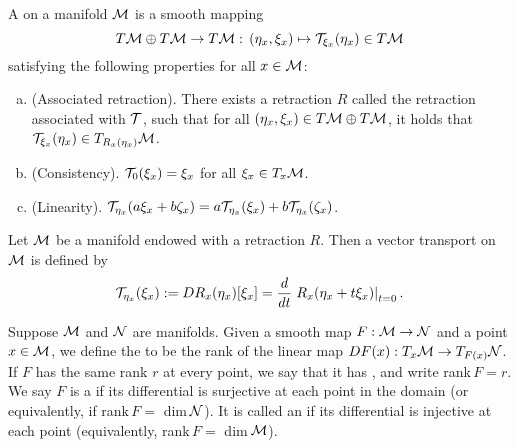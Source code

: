 \documentclass[11pt,a4paper]{article}
\begin{document}
\begin{definition}\label{def:vector_transport}
A  on a manifold $\mathcal{M}$ is a smooth mapping
\begin{equation*}
T\mathcal{M}\oplus T\mathcal{M}\rightarrow T\mathcal{M} :\,(\eta_x,\xi_x)\mapsto \mathcal{T}_{\xi_x}(\eta_x)\in T\mathcal{M}
\end{equation*}
satisfying the following properties for all $x\in \mathcal{M}$:
\begin{enumerate}[(a)]
    \item (Associated retraction). There exists a retraction $R$ called the retraction associated with $\mathcal{T}$, such that for all $(\eta_x,\xi_x)\in T\mathcal{M}\oplus T\mathcal{M}$, it holds that $\mathcal{T}_{\xi_x}(\eta_x)\in T_{R_x(\eta_x)}\mathcal{M}$.
    \item (Consistency). $\mathcal{T}_0(\xi_x) = \xi_x$ for all $\xi_x\in T_x\mathcal{M}$.
    \item (Linearity). $\mathcal{T}_{\eta_x}(a\xi_x+b\zeta_x) = a\mathcal{T}_{\eta_x}(\xi_x)+b\mathcal{T}_{\eta_x}(\zeta_x)$.
\end{enumerate}
\end{definition}

\begin{proposition}\label{prop:vector_transport_diff_retraction}
Let $\mathcal{M}$ be a manifold endowed with a retraction $R$. Then a vector transport on $\mathcal{M}$ is defined by 
\begin{equation}
\mathcal{T}_{\eta_x}(\xi_x) := DR_x(\eta_x)[\xi_x] = \dfrac{d}{dt} \left.R_x(\eta_x+t\xi_x)\right|_{t=0}.
\end{equation}
\end{proposition}

\begin{definition}
Suppose $\mathcal{M}$ and $\mathcal{N}$ are manifolds. Given a smooth map $F:\mathcal{M}\rightarrow \mathcal{N}$ and a point $x\in \mathcal{M}$, we define the  to be the rank of the linear map $DF(x):T_x\mathcal{M}\rightarrow T_{F(x)}\mathcal{N}$. If $F$ has the same rank $r$ at every point, we say that it has , and write rank$\,F = r$. We say $F$ is a  if its differential is surjective at each point in the domain (or equivalently, if rank$\,F =$ dim$\,\mathcal{N}$). It is called an  if its differential is injective at each point (equivalently, rank$\,F = $ dim$\,\mathcal{M}$).
\end{definition}
\end{document}

